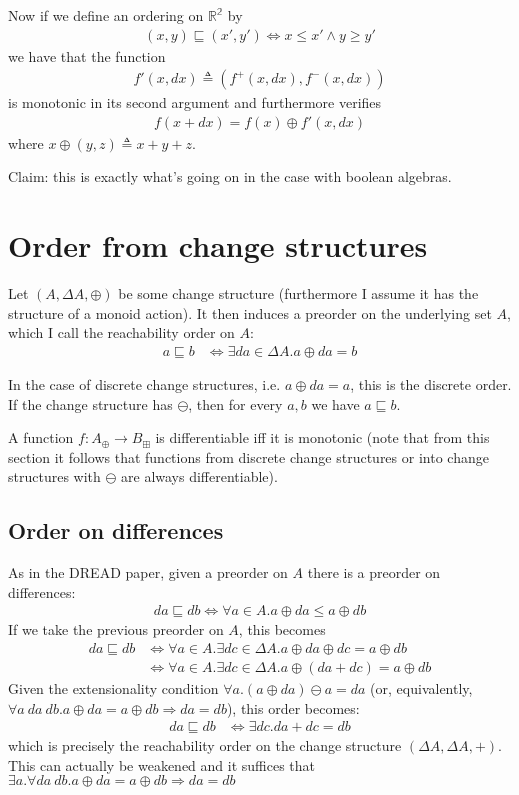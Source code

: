 \documentclass[english]{article}
\newcommand{\als}[1]{\begin{align*} #1 \end{align*}}
\theoremstyle{plain}
\theoremstyle{remark}
\theoremstyle{remark}
\theoremstyle{remark}
\theoremstyle{definition}
\theoremstyle{definition}
\newcommand{\ra}[0]{\rightarrow}
\begin{document}
Now if we define an ordering on $\mathbb{R^2}$ by
\begin{align*}
  (x, y) \sqsubseteq (x', y') \Leftrightarrow x \leq x' \wedge y \geq y'
\end{align*}
we have that the function
\begin{align*}
  f'(x, dx) \triangleq (f^+(x, dx), f^-(x, dx))
\end{align*}
is monotonic in its second argument and furthermore verifies
\begin{align*}
  f(x + dx) = f(x) \oplus f'(x, dx)
\end{align*}
where $x \oplus (y, z) \triangleq x + y + z$.

Claim: this is exactly what's going on in the case with boolean algebras.

\section{Order from change structures}

Let $(A, \Delta A, \oplus)$ be some change structure (furthermore I assume it has the structure
of a monoid action). It then induces a preorder on the underlying set $A$, which I call the
reachability order on $A$:
\begin{align*}
  a \sqsubseteq b &\Leftrightarrow \exists da \in \Delta A . a \oplus da = b
\end{align*}

In the case of discrete change structures, i.e. $a \oplus da = a$, this is the discrete order.
If the change structure has $\ominus$, then for every $a, b$ we have $a \sqsubseteq b$.

A function $f : A_\oplus \ra B_\boxplus$ is differentiable iff it is monotonic (note that from
this section it follows that functions from discrete change structures or into change structures
with $\ominus$ are always differentiable).

\subsection{Order on differences}

As in the DREAD paper, given a preorder on $A$ there is a preorder on differences:
\als{
  da \sqsubseteq db \Leftrightarrow \forall a \in A . a \oplus da \leq a \oplus db
}
If we take the previous preorder on $A$, this becomes
\als{
  da \sqsubseteq db &\Leftrightarrow \forall a \in A .\exists dc \in \Delta A
  . a \oplus da \oplus dc = a \oplus db\\
  &\Leftrightarrow \forall a \in A . \exists dc \in \Delta A
  . a \oplus (da + dc) = a \oplus db
}
Given the extensionality condition $ \forall a . (a \oplus da) \ominus a = da$ (or, equivalently,
$ \forall a\ da\ db. a \oplus da = a \oplus db \Rightarrow da = db$), this order becomes:
\als{
  da \sqsubseteq db &\Leftrightarrow \exists dc . da + dc = db
}
which is precisely the reachability order on the change structure $(\Delta A, \Delta A, +)$.
This can actually be weakened and it suffices that
$\exists a .\forall da\ db. a \oplus da = a \oplus db \Rightarrow da = db$
\end{document}
